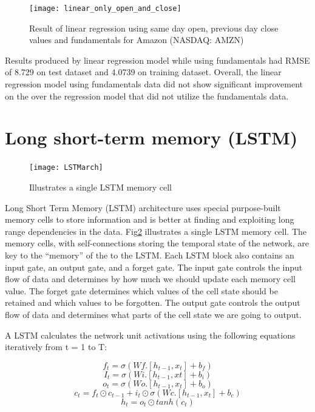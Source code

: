 \documentclass{article}
\begin{document}
\begin{figure}[H]
\centering
\texttt{[image: linear\_only\_open\_and\_close]}
\caption{Result of linear regression using same day open, previous day close values and fundamentals for Amazon (NASDAQ: AMZN)}
\label{fig:linear_withfunda}
\end{figure}

Results produced by linear regression model while using fundamentals had RMSE of 8.729 on test dataset and 4.0739 on training dataset. Overall, the linear regression model using fundamentals data did not show significant improvement on the over the regression model that did not utilize the fundamentals data.

\section{Long short-term memory (LSTM)}
\label{sec:lstm}
\begin{figure}[h]
\centering
\texttt{[image: LSTMarch]}
\caption{Illustrates a single LSTM memory cell}
\label{fig:lstmcell}
\end{figure}

Long Short Term Memory (LSTM) architecture\cite{hochreiter_schmidhuber_1997} uses special purpose-built memory cells to store information and is better at finding and exploiting long range dependencies in the data. Fig\ref{fig:lstmcell} illustrates a single LSTM memory cell. The memory cells, with self-connections storing the temporal state of the network, are key to the “memory” of the to the LSTM. Each LSTM block also contains an input gate, an output gate, and a forget gate. The input gate controls the input flow of data and determines by how much we should update each memory cell value. The forget gate determines which values of the cell state should be retained and which values to be forgotten. The output gate controls the output flow of data and determines what parts of the cell state we are going to output.

A LSTM calculates the network unit activations using the following equations iteratively from t = 1 to T:

\begin{equation}
f_t  = \sigma ( Wf.[h_{t-1}, x_t] + b_f)
\end{equation}
\begin{equation}
I_t  = \sigma ( Wi.[h_{t-1}, xt] + b_i)
\end{equation}
\begin{equation}
o_t  = \sigma ( Wo.[h_{t-1}, x_t] + b_o)
\end{equation}
\begin{equation}
c_t = f_t \odot c_{t-1}  +  i_t \odot\sigma ( Wc.[h_{t-1}, x_t] + b_c)
\end{equation}
\begin{equation}
h_t = o_t \odot tanh(c_t)
\end{equation}
\end{document}
